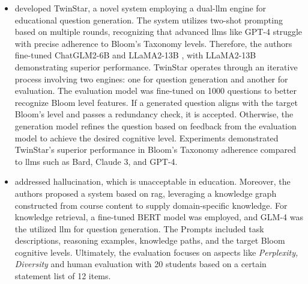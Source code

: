 \begin{itemize}
    \item \cite{zhuge_twinstar_2025} developed TwinStar, a novel system employing a dual-\ac{llm} engine for educational question generation. The system utilizes two-shot prompting based on multiple rounds, recognizing that advanced \ac{llms} like GPT-4 struggle with precise adherence to Bloom's Taxonomy levels. Therefore, the authors fine-tuned ChatGLM2-6B \cite{glm_chatglm_2024} and LLaMA2-13B \cite{touvron_llama_2023-1}, with LLaMA2-13B demonstrating superior performance. TwinStar operates through an iterative process involving two engines: one for question generation and another for evaluation. The evaluation model was fine-tuned on 1000 questions to better recognize Bloom level features. If a generated question aligns with the target Bloom's level and passes a redundancy check, it is accepted. Otherwise, the generation model refines the question based on feedback from the evaluation model to achieve the desired cognitive level. Experiments demonstrated TwinStar's superior performance in Bloom's Taxonomy adherence compared to \ac{llms} such as Bard, Claude 3, and GPT-4.
    \item \cite{yang_heuristic_2024} addressed hallucination, which is unacceptable in education. Moreover, the authors proposed a system based on \ac{rag}, leveraging a knowledge graph constructed from course content to supply domain-specific knowledge. For knowledge retrieval, a fine-tuned BERT model was employed, and GLM-4 \cite{glm_chatglm_2024} was the utilized \ac{llm} for question generation. The Prompts included task descriptions, reasoning examples, knowledge paths, and the target Bloom cognitive levels. Ultimately, the evaluation focuses on aspects like \textit{Perplexity, Diversity} and human evaluation with 20 students based on a certain statement list of 12 items.

\end{itemize}
